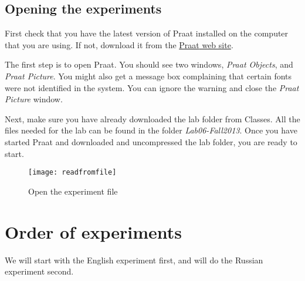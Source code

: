 \documentclass{article}
\newcommand{\soft}[1]{\textsf{#1}}
\newcommand{\Praat}{\soft{Praat}}
\begin{document}

\subsection{Opening the experiments}

First check that you have the latest  version of \Praat{}  installed on the computer that you are using. If not, download it from the \href{http://www.praat.org/}{\Praat{} web site}.

The first step is to open \Praat{}. You should see two windows, \emph{\Praat{} Objects}, and \emph{\Praat{} Picture}. You might also get a message box complaining that certain fonts were not identified in the system. You can ignore the warning and close the \emph{\Praat{} Picture} window.

Next, make sure you have already downloaded the lab folder from Classes. All the files needed for the lab can be found in the folder \emph{Lab06-Fall2013}. Once you have started \Praat{} and downloaded and uncompressed the lab folder, you are ready to start.

\begin{figure}[!tbp]
\caption{Open the experiment file}
\label{readfromfile}
	\begin{center}
		\texttt{[image: readfromfile]}
	\end{center}
\end{figure}

\section{Order of experiments}
%

We will start with the English experiment first, and will do the Russian experiment second.
\end{document}
